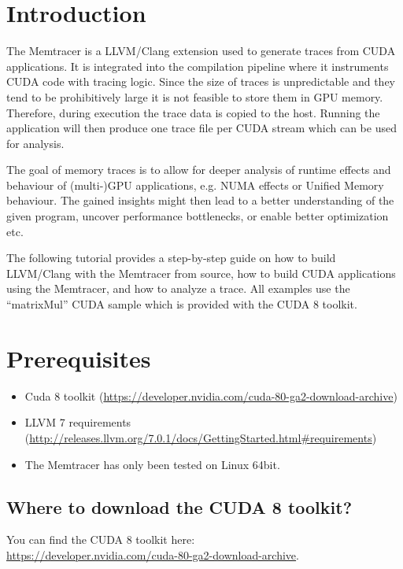 \documentclass{scrartcl}
\author{Georg Weisert}
\begin{document}
\setcounter{tocdepth}{1}
\tableofcontents

\newpage 

\section{Introduction}

The Memtracer is a LLVM/Clang extension used to generate traces from CUDA applications. It is integrated into the compilation pipeline where it instruments CUDA code with tracing logic. Since the size of traces is unpredictable and they tend to be prohibitively large it is not feasible to store them in GPU memory. Therefore, during execution the trace data is copied to the host. Running the application will then produce one trace file per CUDA stream which can be used for analysis.

The goal of memory traces is to allow for deeper analysis of runtime effects and behaviour of (multi-)GPU applications, e.g. NUMA effects or Unified Memory behaviour. The gained insights might then lead to a better understanding of the given program, uncover performance bottlenecks, or enable better optimization etc.

The following tutorial provides a step-by-step guide on how to build LLVM/Clang with the Memtracer from source, how to build CUDA applications using the Memtracer, and how to analyze a trace.
All examples use the “matrixMul” CUDA sample which is provided with the CUDA 8 toolkit.



\section{Prerequisites}
\begin{itemize}
\item Cuda 8 toolkit (\url{https://developer.nvidia.com/cuda-80-ga2-download-archive})
\item LLVM 7 requirements (\url{http://releases.llvm.org/7.0.1/docs/GettingStarted.html#requirements})
\item The Memtracer has only been tested on Linux 64bit.
\end{itemize}

\subsection{Where to download the CUDA 8 toolkit?}
You can find the CUDA 8 toolkit here:\\
\url{https://developer.nvidia.com/cuda-80-ga2-download-archive}. \\
\end{document}

